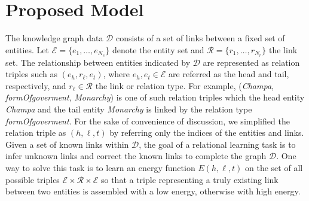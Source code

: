 \documentclass[9pt]{sig-alternate-05-2015}
\begin{document}
\section{Proposed Model} \label{math}
The knowledge graph data $\mathcal{D}$ consists of a set of links between a fixed set of entities. Let $\mathcal{E} = \{e_1, \ldots, e_{N_e}\}$ denote the entity set and $\mathcal{R} = \{r_1, \ldots, r_{N_r}\}$ the link set.  The relationship between entities indicated by $\mathcal{D}$ are represented as relation triples such as $(e_h,r_{\ell},e_t)$, where $e_h, e_t\in \mathcal{E}$ are referred as the head  and tail, respectively, and  $r_{\ell} \in \mathcal{R}$ the link or relation type.  For example, (\emph{Champa}, \emph{formOfgoverment}, \emph{Monarchy}) is one of such relation triples which the head entity \emph{Champa} and the tail entity \emph{Monarchy} is linked by the relation type \emph{formOfgoverment}.  For the sake of convenience of discussion, we simplified the relation triple as $(h,\ell, t)$   by referring only the indices of the entities and links. Given a set of known links within $\mathcal{D}$, the goal of a relational learning task is to  infer unknown links and correct the known links to complete the graph $\mathcal{D}$. One way to solve this task is to learn an energy function $E(h, \ell, t)$ on the set of all possible triples $\mathcal{E} \times \mathcal{R} \times \mathcal{E}$ so that a triple representing a truly existing link between two entities  is assembled with a low energy, otherwise with high energy. 

\end{document}
